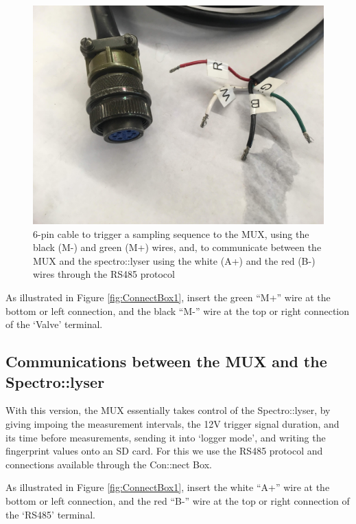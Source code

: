 \documentclass[]{book}
\begin{document}
\begin{figure}

{\centering \includegraphics[width=0.8\linewidth]{pictures/6-pin-cable} 

}

\caption{6-pin cable to trigger a sampling sequence to the MUX, using the black (M-) and green (M+) wires, and, to communicate between the MUX and the spectro::lyser using the white (A+) and the red (B-) wires through the RS485 protocol}\label{fig:6-pin-cable}
\end{figure}

As illustrated in Figure \ref{fig:ConnectBox1}, insert the green ``M+'' wire at the bottom or left connection, and the black ``M-'' wire at the top or right connection of the `Valve' terminal.

\hypertarget{communications-between-the-mux-and-the-spectrolyser}{%
\subsection{Communications between the MUX and the Spectro::lyser}\label{communications-between-the-mux-and-the-spectrolyser}}

With this version, the MUX essentially takes control of the Spectro::lyser, by giving impoing the measurement intervals, the 12V trigger signal duration, and its time before measurements, sending it into `logger mode', and writing the fingerprint values onto an SD card. For this we use the RS485 protocol and connections available through the Con::nect Box.

As illustrated in Figure \ref{fig:ConnectBox1}, insert the white ``A+'' wire at the bottom or left connection, and the red ``B-'' wire at the top or right connection of the `RS485' terminal.
\end{document}
